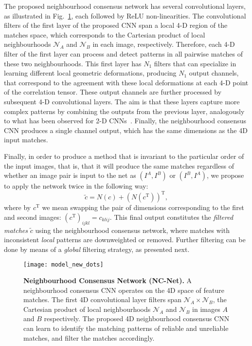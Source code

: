 \documentclass{article}
\begin{document}
 The proposed neighbourhood consensus network has several convolutional layers, as illustrated in Fig.~\ref{fig:model}, each followed by ReLU non-linearities. The convolutional filters of the first layer of the proposed CNN span a local 4-D region of the matches space, which corresponds to the Cartesian product of local neighbourhoods $\mathcal{N}_A$ and $\mathcal{N}_B$ in each image, respectively. Therefore, each 4-D filter of the first layer can process and detect patterns in all pairwise matches of these two neighbourhoods. This first layer has $N_1$ filters that can specialize in learning different local geometric deformations, producing $N_1$ output channels, that correspond to the agreement with these local deformations at each 4-D point of the correlation tensor.
 These output channels are further processed by subsequent 4-D convolutional layers. The aim is that these layers capture more complex patterns by combining the outputs from the previous layer, analogously to what has been observed for 2-D CNNs~\cite{zeiler2014visualizing}.
 Finally, the neighbourhood consensus CNN produces a single channel output, which has the same dimensions as the 4D input matches.

Finally, in order to produce a method that is invariant to the particular order of the input images, that is, that it will produce the same matches regardless of whether an image pair is input to the net as $(I^A,I^B)$ or $(I^B,I^A)$, we propose to apply the network twice in the following way:
\begin{equation}
    \tilde{c}=N(c)+{\left(N(c^\text{T})\right)}^\text{T},
\end{equation}
where by $c^\text{T}$ we mean swapping the pair of dimensions corresponding to the first and second images: $\left(c^\text{T}\right)_{ijkl}=c_{klij}$.
This final output constitutes the \emph{filtered matches} $\tilde{c}$ using the neighbourhood consensus network, where matches with inconsistent \emph{local} patterns are downweighted or removed. Further filtering can be done by means of a  \emph{global} filtering strategy, as presented next.

\begin{figure}[t]
  \centering
    \texttt{[image: model\_new\_dots]}
    \caption{\small \textbf{Neighbourhood Consensus Network (NC-Net).} A neighbourhood consensus CNN operates on the 4D space of feature matches. The first 4D convolutional layer filters
    span $\mathcal{N}_A\times\mathcal{N}_B$, the Cartesian product of local neighbourhoods $\mathcal{N}_A$ and $\mathcal{N}_B$ in images $A$ and $B$ respectively. The proposed 4D neighbourhood consensus CNN can learn to identify the matching patterns of reliable and unreliable matches, and filter the matches accordingly.\label{fig:model}}
\end{figure}
\end{document}
